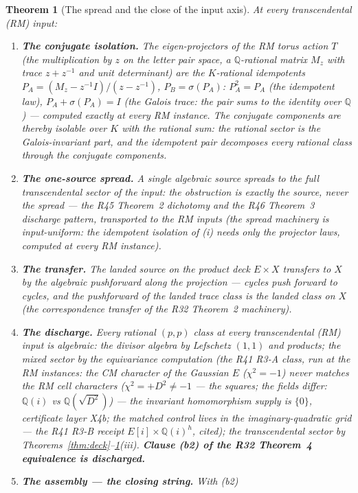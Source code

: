 \documentclass[11pt]{article}
\newtheorem{theorem}{Theorem}
\theoremstyle{definition}
\begin{document}
\begin{theorem}[The spread and the close of the input axis]\label{thm:close}
At every transcendental (RM) input:
\begin{enumerate}[label=(\roman*)]
\item \textbf{The conjugate isolation.} The eigen-projectors of the RM
torus action $T$ (the multiplication by $z$ on the letter pair space, a
$\mathbb{Q}$-rational matrix $M_z$ with trace $z+z^{-1}$ and unit
determinant) are the $K$-rational idempotents
$P_A=(M_z-z^{-1}I)/(z-z^{-1})$, $P_B=\sigma(P_A)$: $P_A^2=P_A$ (the
idempotent law), $P_A+\sigma(P_A)=I$ (the Galois trace: the pair sums
to the identity over $\mathbb{Q}$) --- computed exactly at every RM
instance. The conjugate components are thereby isolable over $K$ with
the rational sum: the rational sector is the Galois-invariant part, and
the idempotent pair decomposes every rational class through the
conjugate components.
\item \textbf{The one-source spread.} A single algebraic source spreads
to the full transcendental sector of the input: the obstruction is
exactly the source, never the spread --- the R45 Theorem~2 dichotomy
and the R46 Theorem~3 discharge pattern, transported to the RM inputs
(the spread machinery is input-uniform: the idempotent isolation of (i)
needs only the projector laws, computed at every RM instance).
\item \textbf{The transfer.} The landed source on the product deck
$E\times X$ transfers to $X$ by the algebraic pushforward along the
projection --- cycles push forward to cycles, and the pushforward of
the landed trace class is the landed class on $X$ (the correspondence
transfer of the R32 Theorem~2 machinery).
\item \textbf{The discharge.} Every rational $(p,p)$ class at every
transcendental (RM) input is algebraic: the divisor algebra by
Lefschetz $(1,1)$ and products; the mixed sector by the equivariance
computation (the R41 R3-A class, run at the RM instances: the CM
character of the Gaussian $E$ ($\chi^2=-1$) never matches the RM cell
characters ($\chi^2=+D^2\neq-1$ --- the squares; the fields differ:
$\mathbb{Q}(i)$ vs $\mathbb{Q}(\sqrt{D^2})$) --- the invariant
homomorphism supply is $\{0\}$, certificate layer X4b; the matched
control lives in the imaginary-quadratic grid --- the R41 R3-B receipt
$E[i]\times\mathbb{Q}(i)^h$, cited); the
transcendental sector by
Theorems~\ref{thm:deck}--\ref{thm:close}(iii). \textbf{Clause (b2) of
the R32 Theorem~4 equivalence is discharged.}
\item \textbf{The assembly --- the closing string.} With (b2)

\end{enumerate}
\end{theorem}
\end{document}
